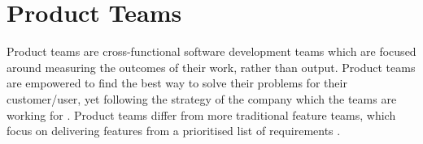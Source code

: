 \section{Product Teams}
Product teams are cross-functional software development teams which are focused around measuring the outcomes of their work, rather than output. Product teams are empowered to find the best way to solve their problems for their customer/user, yet following the strategy of the company which the teams are working for \cite{product_teams_2019}. Product teams differ from more traditional feature teams, which focus on delivering features from a prioritised list of requirements \cite{product_teams_2019}.
